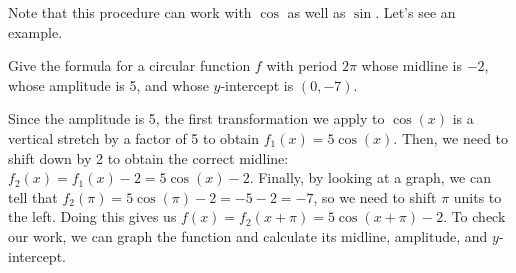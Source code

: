 \documentclass{ximera}
\begin{document}
Note that this procedure can work with $\cos$ as well as $\sin$. Let's see an example.

\begin{example}
Give the formula for a circular function $f$ with period $2\pi$ whose midline is $-2$, whose amplitude is 5, and whose $y$-intercept is $(0, -7)$.

\begin{explanation}
Since the amplitude is 5, the first transformation we apply to $\cos(x)$ is a vertical stretch by a factor of 5 to obtain $f_1(x) = 5\cos(x)$. Then, we need to shift down by 2 to obtain the correct midline: $f_2(x) = f_1(x) - 2 = 5\cos(x) - 2$. Finally, by looking at a graph, we can tell that $f_2(\pi) = 5\cos(\pi) - 2 = -5 - 2 = -7$, so we need to shift $\pi$ units to the left. Doing this gives us $f(x) = f_2(x + \pi) = 5\cos(x + \pi) - 2$. To check our work, we can graph the function and calculate its midline, amplitude, and $y$-intercept. 
\end{explanation}
\end{example} 
\end{document}
